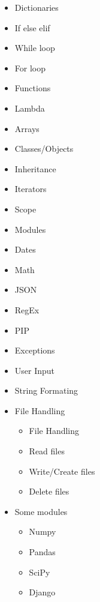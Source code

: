 \documentclass[12pt, letterpaper]{article}
\begin{document}
\begin{enumerate}
\begin{itemize}
\begin{enumerate}
\begin{itemize}
                \item Dictionaries
                \item If else elif
                \item While loop
                \item For loop
                \item Functions
                \item Lambda
                \item Arrays
                \item Classes/Objects
                \item Inheritance
                \item Iterators
                \item Scope
                \item Modules
                \item Dates
                \item Math
                \item JSON
                \item RegEx
                \item PIP
                \item Exceptions
                \item User Input
                \item String Formating
                \item File Handling
                \begin{itemize}
                    \item File Handling
                    \item Read files
                    \item Write/Create files
                    \item Delete files
                \end{itemize}
                \item Some modules
                \begin{itemize}
                    \item Numpy
                    \item Pandas
                    \item SciPy
                    \item Django
                \end{itemize}
            \end{itemize}
        \end{enumerate}

\end{itemize}
\end{enumerate}
\end{document}
